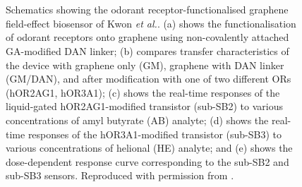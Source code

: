 \documentclass[
  a4paper,
]{scrbook}
\begin{document}
\begin{figure}
\begin{minipage}[t]{0.03\linewidth}
{{}

}

\end{minipage}%
%
\begin{minipage}[t]{0.01\linewidth}

{\centering 

~

}

\end{minipage}%
%
\begin{minipage}[t]{0.45\linewidth}

{\centering 


}

\end{minipage}%
%
\begin{minipage}[t]{0.01\linewidth}

{\centering 

~

}

\end{minipage}%

\caption{\label{fig-kwon-multiplexed}Schematics showing the odorant
receptor-functionalised graphene field-effect biosensor of Kwon \emph{et
al.}. (a) shows the functionalisation of odorant receptors onto graphene
using non-covalently attached GA-modified DAN linker; (b) compares
transfer characteristics of the device with graphene only (GM), graphene
with DAN linker (GM/DAN), and after modification with one of two
different ORs (hOR2AG1, hOR3A1); (c) shows the real-time responses of
the liquid-gated hOR2AG1-modified transistor (sub-SB2) to various
concentrations of amyl butyrate (AB) analyte; (d) shows the real-time
responses of the hOR3A1-modified transistor (sub-SB3) to various
concentrations of helional (HE) analyte; and (e) shows the
dose-dependent response curve corresponding to the sub-SB2 and sub-SB3
sensors. Reproduced with permission from \autocite{Kwon2015}.}

\end{figure}
\end{document}
